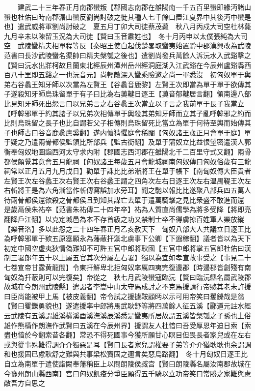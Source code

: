 　　建武二十三年春正月南郡蠻叛【郡國志南郡在雒陽南一千五百里蠻即緣沔諸山蠻也杜佑曰時南郡潳山蠻反劉尚討破之徙其種人七千餘口置江夏界中其後沔中蠻是也】遣武威將軍劉尚討破之　夏五月丁卯大司徒蔡茂薨　秋八月丙戍大司空杜林薨　九月辛未以陳留玉況為大司徒【賢曰玉音肅姓也】　冬十月丙申以太僕張純為大司空　武陵蠻精夫相單程等反【秦昭王使白起伐楚畧取蠻夷始置黔中郡漢興改為武陵范書曰長沙武陵蠻名渠帥曰精夫槃瓠之後也】遣劉尚發兵萬餘人泝沅水入武谿擊之【賢曰沅水出牂柯故且蘭東北經辰州潭州岳州經洞庭湖入江武谿在今辰州盧谿縣西百八十里即五谿之一也沅音元】尚輕敵深入蠻乘險邀之尚一軍悉沒　初匈奴單于輿弟右谷蠡王知牙師以次當為左賢王【谷蠡音鹿黎】左賢王次即當為單于單于欲傳其子遂殺知牙師烏珠留單于有子曰比為右薁鞬日逐王【薁音郁鞬居言翻】領南邊八部比見知牙師死出怨言曰以兄弟言之右谷蠡王次當立以子言之我前單于長子我當立【呼韓邪單于約其諸子以兄弟次相傳單于輿殺其弟知牙師而立其子亂呼韓邪之約而比則烏珠留之長子也比自謂若父子相傳則烏珠留死比當立為單于何待至輿而始傳其子也師古曰谷音鹿蠡盧奚翻】遂内懷猜懼庭會稀闊【匈奴諸王歲正月會單于庭】單于疑之乃遣兩骨都侯監領比所部兵【監古銜翻】及單于蒲奴立比益恨望密遣漢人郭衡奉匈奴地圖詣西河太守求内附【郡國志西河郡在雒陽北千二百里守式又翻】兩骨都侯頗覺其意會五月龍祠【匈奴諸王每歲五月會龍城祠南匈奴傳曰匈奴俗歲有三龍祠常以正月五月九月戊日】勸單于誅比比弟漸將王在單于帳下【南匈奴傳大臣貴者左賢王次左谷蠡王次右賢王次右谷蠡王謂之四角次左右日逐王次左右温禺鞮王次左右斬將王是為六角漸當作斬傳寫誤加水旁耳】聞之馳以報比比遂聚八部兵四五萬人待兩骨都侯還欲殺之骨都侯且到知其謀亡去單于遣萬騎擊之見比衆盛不敢進而還　是歲鬲侯朱祐卒【范書朱祐傳二十四年卒】祐為人質直尚儒學為將多受降【將即亮翻降戶江翻】以克定城邑為本不存首級之功又禁制士卒不得虜掠百姓軍人樂放縱【樂音洛】多以此怨之二十四年春正月乙亥赦天下　匈奴八部大人共議立日逐王比為呼韓邪單于欵五原塞願永為藩蔽扞禦北虜事下公卿【下遐稼翻】議者皆以為天下初定中國空虚夷狄情偽難知不可許五官中郎將耿國【五官中郎將掌五官郎杜佑曰漢制三署郎年五十以上屬五官其次分屬左右署】獨以為宜如孝宣故事受之【事見二十七卷宣帝甘露黄龍間】令東扞鮮卑北拒匈奴率厲四夷完復邊郡【時邊郡皆創殘有南匈奴為扞蔽則可以完復矣】帝從之　秋七月武陵蠻寇臨沅【賢曰臨沅縣名屬武陵郡故城在今朗州武陵縣】遣謁者李嵩中山太守馬成討之不克馬援請行帝愍其老未許援曰臣尚能被甲上馬【被皮義翻】帝令試之援據鞍顧眄以示可用帝笑曰矍鑠哉是翁【賢曰矍鑠勇貌也】遂遣援率中郎將馬武耿舒等將四萬餘人征五溪【酈道元註水經云武陵有五溪謂雄溪樠溪酉溪潕溪辰溪悉是蠻夷所居故謂五溪皆槃瓠之子孫也土俗雄作熊樠作朗潕作武賢曰五溪在今辰州界】援謂友人杜愔曰吾受厚恩年迫日索【索盡也愔於今翻索昔各翻】常恐不得死國事今獲所願甘心瞑目但畏長者家兒或在左右或與從事殊難得調介介獨惡是耳【賢曰長者家兒謂權要子弟等介介猶耿耿也余謂調和也援固已慮耿舒之難與共事梁松竇固之邇言矣惡烏路翻】　冬十月匈奴日逐王比自立為南單于遣使詣闕奉藩稱臣上以問朗陵侯臧宫【賢曰朗陵縣名屬汝南郡故城在今豫州朗山縣西南】宫曰匈奴飢疫分爭臣願得五千騎以立功帝笑曰常勝之家難與慮敵吾方自思之


